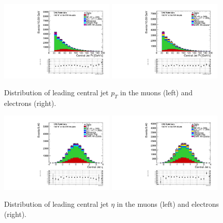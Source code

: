 \begin{figure}
\begin{center}
\includegraphics[width=0.49\textwidth]{figs/n-1_plots_mu/mu_EWK_W_2jets_centraljet_pt_mjj_600_tagjet1_60_tagjet2_50_Zeppenfield_1point2_EWKW2jets.pdf}
\includegraphics[width=0.49\textwidth]{figs/n-1_plots_el/el_EWK_W_2jets_centraljet_pt_mjj_600_tagjet1_60_tagjet2_50_Zeppenfield_1point2_met_30_WmT_30_EWKW2jets.pdf}
\end{center}
\caption{Distribution of leading central jet $p_{T}$ in the muons (left) and electrons (right).}
\label{fig:centraljetleadingjetpt_20}
\end{figure}

\begin{figure}
\begin{center}
\includegraphics[width=0.49\textwidth]{figs/n-1_plots_mu/mu_EWK_W_2jets_centraljet_eta_mjj_600_tagjet1_60_tagjet2_50_Zeppenfield_1point2_EWKW2jets.pdf}
\includegraphics[width=0.49\textwidth]{figs/n-1_plots_el/el_EWK_W_2jets_centraljet_eta_mjj_600_tagjet1_60_tagjet2_50_Zeppenfield_1point2_met_30_WmT_30_EWKW2jets.pdf}
\end{center}
\caption{Distribution of leading central jet $\eta$  in the muons (left) and electrons (right).}
\label{fig:centraljetleadingjeteta_20}
\end{figure}

